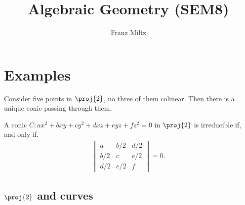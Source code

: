 \documentclass{article}
\begin{document}
\mkthmstwounified
\title{Algebraic Geometry (SEM8)}
\author{Franz Miltz}
\maketitle
\tableofcontents
\pagebreak

\section{Examples}

\begin{lemma}
  Consider five points in $\proj{2}$, no three of them colinear.
  Then there is a unique conic passing through them.
\end{lemma}

\begin{lemma}
  A conic $C:ax^2+bxy+cy^2+dxz+eyz+fz^2=0$ in $\proj{2}$ is
  irreducible if, and only if,
  \begin{align*}
    \begin{vmatrix}
      a & b/2 & d/2 \\
      b/2 & c & e/2 \\
      d/2 & e/2 & f
    \end{vmatrix}
    = 0.
  \end{align*}
\end{lemma}

\subsection{$\proj{2}$ and curves}
\end{document}
